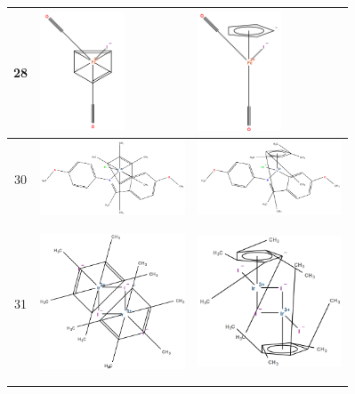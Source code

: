 \begin{longtable}{c>{\centering}m{5cm}>{\centering\arraybackslash}m{5.9cm}}
 28 &
 \includegraphics[width=2.5cm]{imagenes/resultados/cps/iron(II)_original.png} & 
 \includegraphics[width=2.5cm]{imagenes/resultados/moleculas/iron(II).png} \\
\midrule

 30 &
 \includegraphics[width=4.3cm]{imagenes/resultados/cps/mol30_original.png} & 
 \includegraphics[width=4.3cm]{imagenes/resultados/cps/mol30_cp.png} \\
\midrule

 31 &
 \includegraphics[width=4.3cm]{imagenes/resultados/cps/mol31_original.png} & 
 \includegraphics[width=4.3cm]{imagenes/resultados/cps/mol31_cp.png} 

\label{tab:cps_dibujado}
\end{longtable}




